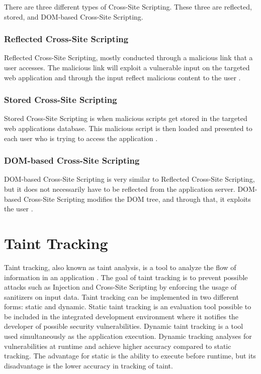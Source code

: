 There are three different types of Cross-Site Scripting. These three are reflected, stored, and DOM-based Cross-Site Scripting.



\subsubsection{Reflected Cross-Site Scripting}
Reflected Cross-Site Scripting, mostly conducted through a malicious link that a user accesses. The malicious link will exploit a vulnerable input on the targeted web application and through the input reflect malicious content to the user \parencite{Secure_Web}.



\subsubsection{Stored Cross-Site Scripting}
Stored Cross-Site Scripting is when malicious scripts get stored in the targeted web applications database. This malicious script is then loaded and presented to each user who is trying to access the application \parencite{Secure_Web}.



\subsubsection{DOM-based Cross-Site Scripting}
DOM-based Cross-Site Scripting is very similar to Reflected Cross-Site Scripting, but it does not necessarily have to be reflected from the application server. DOM-based Cross-Site Scripting modifies the DOM tree, and through that, it exploits the user \parencite{Secure_Web}.



\section{Taint Tracking}
\label{DynamicTaintTracking}
Taint tracking, also known as taint analysis, is a tool to analyze the flow of information in an application \parencite{Pan2015}. The goal of taint tracking is to prevent possible attacks such as Injection and Cross-Site Scripting by enforcing the usage of sanitizers on input data. Taint tracking can be implemented in two different forms: static and dynamic. Static taint tracking is an evaluation tool possible to be included in the integrated development environment where it notifies the developer of possible security vulnerabilities. Dynamic taint tracking is a tool used simultaneously as the application execution. Dynamic tracking analyses for vulnerabilities at runtime and achieve higher accuracy compared to static tracking. The advantage for static is the ability to execute before runtime, but its disadvantage is the lower accuracy in tracking of taint.

